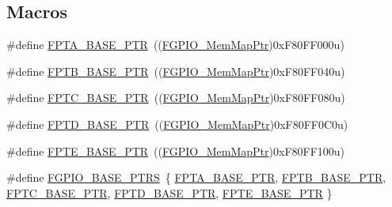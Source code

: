\subsection*{Macros}
\begin{DoxyCompactItemize}
\item 
\#define \hyperlink{group___f_g_p_i_o___peripheral_ga4b0d89f517528ab7c1d2fdefe4c863d8}{F\+P\+T\+A\+\_\+\+B\+A\+S\+E\+\_\+\+P\+T\+R}~((\hyperlink{group___f_g_p_i_o___peripheral_gaeed3beeb5e5c99ae5b0e404b21466e55}{F\+G\+P\+I\+O\+\_\+\+Mem\+Map\+Ptr})0x\+F80\+F\+F000u)
\item 
\#define \hyperlink{group___f_g_p_i_o___peripheral_ga725ec21a43213bffe0aa484f7406bcf5}{F\+P\+T\+B\+\_\+\+B\+A\+S\+E\+\_\+\+P\+T\+R}~((\hyperlink{group___f_g_p_i_o___peripheral_gaeed3beeb5e5c99ae5b0e404b21466e55}{F\+G\+P\+I\+O\+\_\+\+Mem\+Map\+Ptr})0x\+F80\+F\+F040u)
\item 
\#define \hyperlink{group___f_g_p_i_o___peripheral_gaed3b8398ebed63795f9ce57eb9a59097}{F\+P\+T\+C\+\_\+\+B\+A\+S\+E\+\_\+\+P\+T\+R}~((\hyperlink{group___f_g_p_i_o___peripheral_gaeed3beeb5e5c99ae5b0e404b21466e55}{F\+G\+P\+I\+O\+\_\+\+Mem\+Map\+Ptr})0x\+F80\+F\+F080u)
\item 
\#define \hyperlink{group___f_g_p_i_o___peripheral_gabaff6b055edb9ba703415d0473b92ca8}{F\+P\+T\+D\+\_\+\+B\+A\+S\+E\+\_\+\+P\+T\+R}~((\hyperlink{group___f_g_p_i_o___peripheral_gaeed3beeb5e5c99ae5b0e404b21466e55}{F\+G\+P\+I\+O\+\_\+\+Mem\+Map\+Ptr})0x\+F80\+F\+F0\+C0u)
\item 
\#define \hyperlink{group___f_g_p_i_o___peripheral_ga191ce600c147c06111ecea5b3b0aa6fb}{F\+P\+T\+E\+\_\+\+B\+A\+S\+E\+\_\+\+P\+T\+R}~((\hyperlink{group___f_g_p_i_o___peripheral_gaeed3beeb5e5c99ae5b0e404b21466e55}{F\+G\+P\+I\+O\+\_\+\+Mem\+Map\+Ptr})0x\+F80\+F\+F100u)
\item 
\#define \hyperlink{group___f_g_p_i_o___peripheral_ga58956e4d0a0ffec3e1dd70e77a5160b4}{F\+G\+P\+I\+O\+\_\+\+B\+A\+S\+E\+\_\+\+P\+T\+R\+S}~\{ \hyperlink{group___f_g_p_i_o___peripheral_ga4b0d89f517528ab7c1d2fdefe4c863d8}{F\+P\+T\+A\+\_\+\+B\+A\+S\+E\+\_\+\+P\+T\+R}, \hyperlink{group___f_g_p_i_o___peripheral_ga725ec21a43213bffe0aa484f7406bcf5}{F\+P\+T\+B\+\_\+\+B\+A\+S\+E\+\_\+\+P\+T\+R}, \hyperlink{group___f_g_p_i_o___peripheral_gaed3b8398ebed63795f9ce57eb9a59097}{F\+P\+T\+C\+\_\+\+B\+A\+S\+E\+\_\+\+P\+T\+R}, \hyperlink{group___f_g_p_i_o___peripheral_gabaff6b055edb9ba703415d0473b92ca8}{F\+P\+T\+D\+\_\+\+B\+A\+S\+E\+\_\+\+P\+T\+R}, \hyperlink{group___f_g_p_i_o___peripheral_ga191ce600c147c06111ecea5b3b0aa6fb}{F\+P\+T\+E\+\_\+\+B\+A\+S\+E\+\_\+\+P\+T\+R} \}
\end{DoxyCompactItemize}
